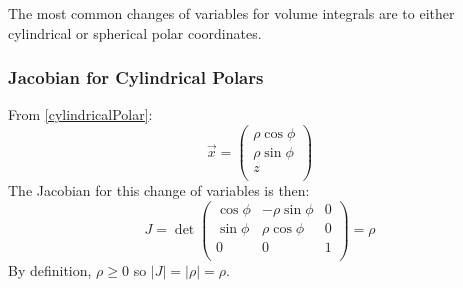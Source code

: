 \documentclass[../main.tex]{subfiles}
\begin{document}
The most common changes of variables for volume integrals are to either cylindrical or spherical polar coordinates.
\subsubsection{Jacobian for Cylindrical Polars}
From \cref{cylindricalPolar}:
\[
  \vec{x} = \begin{pmatrix}
  \rho \cos \phi \\
  \rho \sin \phi \\
  z \\
  \end{pmatrix}
\]
The Jacobian for this change of variables is then:
\[
  J = \det \begin{pmatrix}
  \cos \phi & -\rho \sin \phi & 0 \\
  \sin \phi & \rho \cos \phi & 0 \\
  0 & 0 & 1 \\
  \end{pmatrix} = \rho
\]
By definition, $\rho \geq 0$ so $|J| = |\rho| = \rho$.
\end{document}
